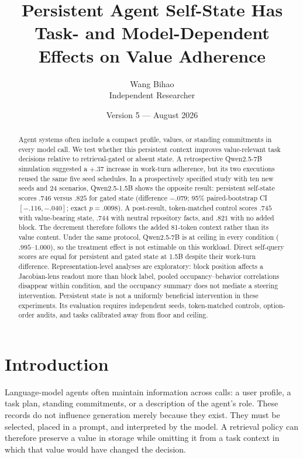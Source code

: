 \documentclass[11pt]{article}
\title{\textbf{Persistent Agent Self-State Has Task- and Model-Dependent Effects on Value Adherence}}
\author{Wang Bihao\\
Independent Researcher}
\date{Version 5 --- August 2026}
\begin{document}
\maketitle

\begin{abstract}
Agent systems often include a compact profile, values, or standing commitments in every model call. We test whether this persistent context improves value-relevant task decisions relative to retrieval-gated or absent state. A retrospective Qwen2.5-7B simulation suggested a $+.37$ increase in work-turn adherence, but its two executions reused the same five seed schedules. In a prospectively specified study with ten new seeds and 24 scenarios, Qwen2.5-1.5B shows the opposite result: persistent self-state scores $.746$ versus $.825$ for gated state (difference $-.079$; 95\% paired-bootstrap CI $[-.116,-.040]$; exact $p=.0098$). A post-result, token-matched control scores $.745$ with value-bearing state, $.744$ with neutral repository facts, and $.821$ with no added block. The decrement therefore follows the added 81-token context rather than its value content. Under the same protocol, Qwen2.5-7B is at ceiling in every condition ($.995$--$1.000$), so the treatment effect is not estimable on this workload. Direct self-query scores are equal for persistent and gated state at 1.5B despite their work-turn difference. Representation-level analyses are exploratory: block position affects a Jacobian-lens readout more than block label, pooled occupancy--behavior correlations disappear within condition, and the occupancy summary does not mediate a steering intervention. Persistent state is not a uniformly beneficial intervention in these experiments. Its evaluation requires independent seeds, token-matched controls, option-order audits, and tasks calibrated away from floor and ceiling.
\end{abstract}

\section{Introduction}
Language-model agents often maintain information across calls: a user profile, a task plan, standing commitments, or a description of the agent's role. These records do not influence generation merely because they exist. They must be selected, placed in a prompt, and interpreted by the model. A retrieval policy can therefore preserve a value in storage while omitting it from a task context in which that value would have changed the decision.
\end{document}
